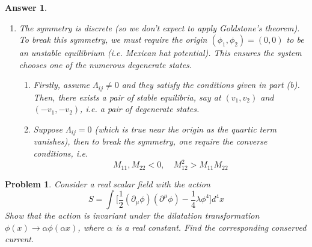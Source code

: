 \documentclass[a4paper]{article}
\newtheorem{ans}{Answer}[section]
\theoremstyle{new}
\newtheorem{qns}{Problem}[section]
\begin{document}
\begin{ans}
\begin{enumerate}[label=(\alph*)]
\begin{enumerate}
    \begin{enumerate}
        \item $$\Lambda_{12}=-\sqrt{\Lambda_{11}\Lambda_{22}}\implies\alpha=\sqrt{\Lambda_{11}/\Lambda_{22}}\implies M_{11}\sqrt{\Lambda_{22}}+M_{22}\sqrt{\Lambda_{11}}+2M_{12}(\Lambda_{11}\Lambda_{22})^{1/4}\geq0$$
        \item $$\Lambda_{11}=0\implies\alpha=0\implies M_{11}\geq0$$
        \item $$\Lambda_{22}=0\implies\alpha=\infty\implies M_{22}\geq0$$
    \end{enumerate}
    \item All $\Lambda_{ij}=0$: require quadratic terms to be semi-positive definite in all directions. Set $\phi_2=\beta\phi_1$, then
    $$M_{11}+2M_{12}\beta+M_{22}\beta^2\geq0~\forall\beta\implies M_{11}\geq0,~M_{22}\geq0\implies\beta_\pm=\frac{-M_{12}\pm\sqrt{M_{12}^2-M_{11}M_{22}}}{M_{22}}$$
    which is complex when $M_{12}^2\leq M_{11}M_{22}$.
\end{enumerate}
\item The symmetry is discrete (so we don't expect to apply Goldstone's theorem). To break this symmetry, we must require the origin $(\phi_1,\phi_2)=(0,0)$ to be an unstable equilibrium (i.e. Mexican hat potential). This ensures the system chooses one of the numerous degenerate states.
\begin{enumerate}
    \item Firstly, assume $\Lambda_{ij}\neq 0$ and they satisfy the conditions given in part (b). Then, there exists a pair of stable equilibria, say at $(v_1,v_2)$ and $(-v_1,-v_2)$, i.e. a pair of degenerate states.
    \item Suppose $\Lambda_{ij}=0$ (which is true near the origin as the quartic term vanishes), then to break the symmetry, one require the converse conditions, i.e.
    $$M_{11},M_{22}<0,\quad M_{12}^2>M_{11}M_{22}$$
\end{enumerate}
\end{enumerate}
\end{ans}
\begin{qns}
Consider a real scalar field with the action
$$S=\int\bigg[\frac{1}{2}(\partial_\mu\phi)(\partial^\mu\phi)-\frac{1}{4}\lambda\phi^4\bigg]d^4x$$
Show that the action is invariant under the dilatation transformation $\phi(x)\rightarrow\alpha\phi(\alpha x)$, where $\alpha$ is a real constant. Find the corresponding conserved current.
\end{qns}
\end{document}
